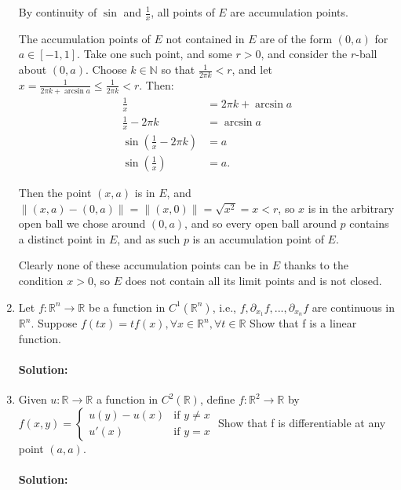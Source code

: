 \documentclass{article}
\begin{document}
\begin{enumerate}
    By continuity of $\sin$ and $\frac{1}{x}$, all points of $E$ are accumulation points. %

    The accumulation points of $E$ not contained in $E$ are of the form $(0,a)$ for $a\in [-1,1]$. Take one such point, and some $r>0$, and consider the $r$-ball about $(0,a)$. Choose $k\in \mathbb{N}$ so that $\frac{1}{2\pi k}<r$, and let $x=\frac{1}{2\pi k+\arcsin a}\leq \frac{1}{2\pi k}<r$. Then: 
    \begin{align*}
        \frac{1}{x}&= 2\pi k +\arcsin a \\
        \frac{1}{x}-2\pi k&= \arcsin a \\
        \sin\left( \frac{1}{x}-2\pi k \right) &= a \\
        \sin\left( \frac{1}{x}\right) &= a
    .\end{align*}

    Then the point $(x,a)$ is in $E$, and $\|(x,a)-(0,a)\|=\|(x,0)\|=\sqrt{x^2} =x<r$, so $x$ is in the arbitrary open ball we chose around $(0,a)$, and so every open ball around $p$ contains a distinct point in $E$, and as such $p$ is an accumulation point of $E$.

    Clearly none of these accumulation points can be in $E$ thanks to the condition $x>0$, so $E$ does not contain all its limit points and is not closed.

\item Let $f : \mathbb{R}^n \to \mathbb{R}$ be a function in $C^1(\mathbb{R}^n)$, i.e., $f, \partial_{x_1} f, ..., \partial_{x_n} f$ are continuous in $\mathbb{R}^n$. Suppose  $f(tx) = t f(x), \forall x \in \mathbb{R}^n, \forall t \in \mathbb{R}$  Show that f is a linear function.  
    \paragraph{Solution: }

\item Given $u : \mathbb{R} \to \mathbb{R}$ a function in $C^2(\mathbb{R})$, define $f : \mathbb{R}^2 \to \mathbb{R}$ by  $f(x,y) = \begin{cases} u(y) - u(x) & \text{if } y \neq x \\ u'(x) & \text{if } y = x \end{cases}$  Show that f is differentiable at any point $(a,a)$.  
    \paragraph{Solution: }


\end{enumerate}
\end{document}
